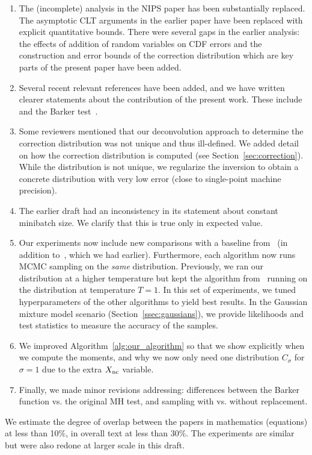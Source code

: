 \documentclass[twoside]{article} \usepackage{aistats2017}
\begin{document}
\begin{enumerate}
\item The (incomplete) analysis in the NIPS paper has been substantially replaced.
  The asymptotic CLT arguments in the earlier paper have been replaced with
  explicit quantitative bounds. There were several gaps in the earlier analysis:
  the effects of addition of random variables on CDF errors and the construction and
  error bounds of the correction distribution which are key parts of the present
  paper have been added. 

\item Several recent relevant references have been added, and we have written
  clearer statements about the contribution of the present work.
  These include~\citep{TallData15} and the Barker test~\citep{Barker65}.

\item Some reviewers mentioned that our deconvolution approach to
  determine the correction distribution was not unique and thus
  ill-defined.  We added detail on how the correction
  distribution is computed (see Section~\ref{sec:correction}). While the distribution is not unique, we
  regularize the inversion to obtain a concrete distribution with very
  low error (close to single-point machine precision).

\item The earlier draft had an inconsistency in its statement about constant
  minibatch size. We clarify that this is true only in expected value.

\item Our experiments now include new comparisons with a baseline
  from~\citep{icml2014c1_bardenet14} (in addition to~\citep{cutting_mh_2014},
  which we had earlier). Furthermore, each algorithm now runs MCMC sampling on
  the \emph{same} distribution.  Previously, we ran our distribution at a
  higher temperature but kept the algorithm from~\citep{cutting_mh_2014}
  running on the distribution at temperature $T=1$. In this set of
  experiments, we tuned hyperparameters of the other algorithms to yield
  best results. In the Gaussian mixture model scenario
  (Section~\ref{ssec:gaussians}), we provide likelihoods and test
  statistics to measure the accuracy of the samples.

\item We improved Algorithm~\ref{alg:our_algorithm} so that we show
  explicitly when we compute the moments, and why we now only need one
  distribution $C_\sigma$ for $\sigma=1$ due to the extra $X_{\rm nc}$
  variable.

\item Finally, we made minor revisions addressing: differences between the
  Barker function vs. the original MH test, and sampling with vs. without
  replacement.
\end{enumerate}

We estimate the degree of overlap between the papers in mathematics (equations) at less than
10\%, in overall text at less than 30\%. The experiments are similar but were also redone at larger
scale in this draft. 
\end{document}
